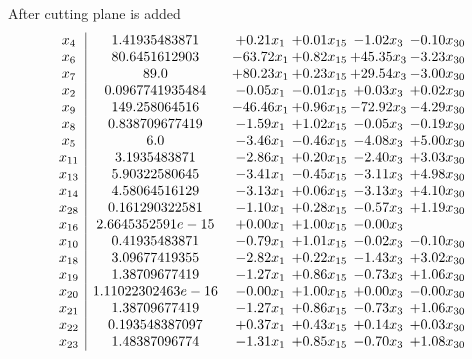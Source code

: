 \documentclass[8pt]{article}
\begin{document}
 After cutting plane is added 
\[\begin{array}{c| c c@{\hskip 2pt} c@{\hskip 2pt} c@{\hskip 2pt} c@{\hskip 2pt} }
 x_{4}   &  1.41935483871 & +  0.21 x_{1} & +  0.01 x_{15} & -1.02 x_{3} & -0.10 x_{30}\\
 x_{6}   &  80.6451612903 & -63.72 x_{1} & +  0.82 x_{15} & + 45.35 x_{3} & -3.23 x_{30}\\
 x_{7}   &  89.0 & + 80.23 x_{1} & +  0.23 x_{15} & + 29.54 x_{3} & -3.00 x_{30}\\
 x_{2}   &  0.0967741935484 & -0.05 x_{1} & -0.01 x_{15} & +  0.03 x_{3} & +  0.02 x_{30}\\
 x_{9}   &  149.258064516 & -46.46 x_{1} & +  0.96 x_{15} & -72.92 x_{3} & -4.29 x_{30}\\
 x_{8}   &  0.838709677419 & -1.59 x_{1} & +  1.02 x_{15} & -0.05 x_{3} & -0.19 x_{30}\\
 x_{5}   &  6.0 & -3.46 x_{1} & -0.46 x_{15} & -4.08 x_{3} & +  5.00 x_{30}\\
 x_{11}   &  3.1935483871 & -2.86 x_{1} & +  0.20 x_{15} & -2.40 x_{3} & +  3.03 x_{30}\\
 x_{13}   &  5.90322580645 & -3.41 x_{1} & -0.45 x_{15} & -3.11 x_{3} & +  4.98 x_{30}\\
 x_{14}   &  4.58064516129 & -3.13 x_{1} & +  0.06 x_{15} & -3.13 x_{3} & +  4.10 x_{30}\\
 x_{28}   &  0.161290322581 & -1.10 x_{1} & +  0.28 x_{15} & -0.57 x_{3} & +  1.19 x_{30}\\
 x_{16}   &  2.6645352591e-15 & +  0.00 x_{1} & +  1.00 x_{15} & -0.00 x_{3} &   \\
 x_{10}   &  0.41935483871 & -0.79 x_{1} & +  1.01 x_{15} & -0.02 x_{3} & -0.10 x_{30}\\
 x_{18}   &  3.09677419355 & -2.82 x_{1} & +  0.22 x_{15} & -1.43 x_{3} & +  3.02 x_{30}\\
 x_{19}   &  1.38709677419 & -1.27 x_{1} & +  0.86 x_{15} & -0.73 x_{3} & +  1.06 x_{30}\\
 x_{20}   &  1.11022302463e-16 & -0.00 x_{1} & +  1.00 x_{15} & +  0.00 x_{3} & -0.00 x_{30}\\
 x_{21}   &  1.38709677419 & -1.27 x_{1} & +  0.86 x_{15} & -0.73 x_{3} & +  1.06 x_{30}\\
 x_{22}   &  0.193548387097 & +  0.37 x_{1} & +  0.43 x_{15} & +  0.14 x_{3} & +  0.03 x_{30}\\
 x_{23}   &  1.48387096774 & -1.31 x_{1} & +  0.85 x_{15} & -0.70 x_{3} & +  1.08 x_{30}\\

\end{array}\]
\end{document}
